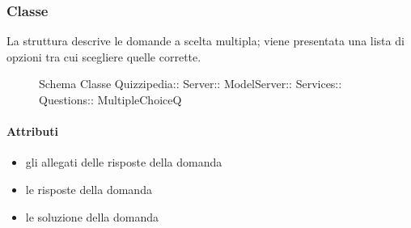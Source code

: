 \subsubsection{Classe }
La struttura descrive le domande a scelta multipla; viene presentata una lista di opzioni tra cui scegliere quelle corrette.
\begin{figure}[H]
\centering
\noindent{}
\caption[Schema Classe MultipleChoiceQ]{Schema Classe Quizzipedia:: Server:: ModelServer:: Services:: Questions:: MultipleChoiceQ}
\end{figure}
\paragraph{Attributi}
\begin{itemize}
\item {}
\newline
gli allegati delle risposte della domanda
\item {}
\newline
le risposte della domanda
\item {}
\newline
le soluzione della domanda
\end{itemize}

